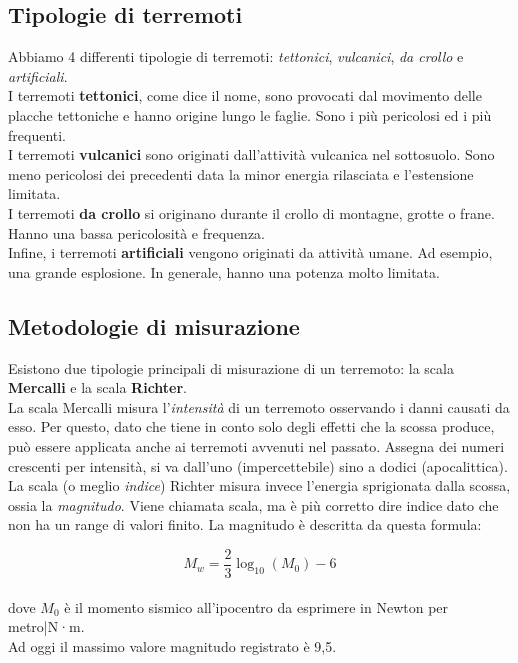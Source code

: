 \documentclass[a4paper,10pt]{memoir}
\begin{document}
\subsection{Tipologie di terremoti}
Abbiamo 4 differenti tipologie di terremoti: \textit{tettonici}, \textit{vulcanici}, \textit{da crollo} e \textit{artificiali}.
\\
I terremoti \textbf{tettonici}, come dice il nome, sono provocati dal movimento delle placche tettoniche e hanno origine lungo le faglie.
Sono i più pericolosi ed i più frequenti.
\\
I terremoti \textbf{vulcanici} sono originati dall'attività vulcanica nel sottosuolo. Sono meno pericolosi dei precedenti data la minor energia rilasciata e l'estensione limitata.
\\
I terremoti \textbf{da crollo} si originano durante il crollo di montagne, grotte o frane. Hanno una bassa pericolosità e frequenza.
\\
Infine, i terremoti \textbf{artificiali} vengono originati da attività umane. Ad esempio, una grande esplosione. In generale, hanno una potenza molto limitata.


\subsection{Metodologie di misurazione}
Esistono due tipologie principali di misurazione di un terremoto: la scala \textbf{Mercalli} e la scala \textbf{Richter}.
\\
La scala Mercalli misura l'\textit{intensità} di un terremoto osservando i danni causati da esso. Per questo, dato che tiene in conto solo degli effetti che la scossa produce, può essere applicata anche ai terremoti avvenuti nel passato.
Assegna dei numeri crescenti per intensità, si va dall'uno (impercettebile) sino a dodici (apocalittica).
\\
La scala (o meglio \textit{indice}) Richter misura invece l'energia sprigionata dalla scossa, ossia la \textit{magnitudo}. Viene chiamata scala, ma è più corretto dire indice dato che non ha un range di valori finito. La magnitudo è descritta da questa formula:

\begin{equation*}
  M_w = {\frac{2}{3}}\log_{10}(M_\mathrm{0}) - 6
\end{equation*}
\\
dove $M_0$ è il momento sismico all'ipocentro da esprimere in Newton per metro|N·m.
\\
Ad oggi il massimo valore magnitudo registrato è 9,5.
\\
\end{document}
